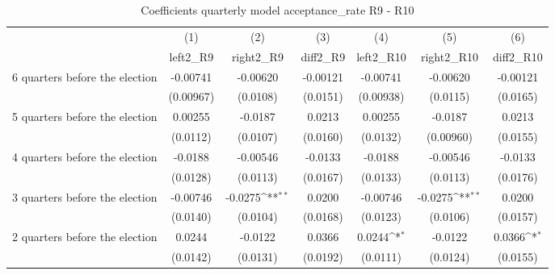 \begin{table}[!ht]\centering \footnotesize
\def\sym#1{\ifmmode^{#1}\else\(^{#1}\)\fi}
\caption{Coefficients quarterly model acceptance\_rate R9 - R10}
\begin{tabular}{l*{6}{c}}
\hline\hline
                    &\multicolumn{1}{c}{(1)}&\multicolumn{1}{c}{(2)}&\multicolumn{1}{c}{(3)}&\multicolumn{1}{c}{(4)}&\multicolumn{1}{c}{(5)}&\multicolumn{1}{c}{(6)}\\
                    &\multicolumn{1}{c}{left2\_R9}&\multicolumn{1}{c}{right2\_R9}&\multicolumn{1}{c}{diff2\_R9}&\multicolumn{1}{c}{left2\_R10}&\multicolumn{1}{c}{right2\_R10}&\multicolumn{1}{c}{diff2\_R10}\\
\hline
 6 quarters before the election&    -0.00741         &    -0.00620         &    -0.00121         &    -0.00741         &    -0.00620         &    -0.00121         \\
                    &   (0.00967)         &    (0.0108)         &    (0.0151)         &   (0.00938)         &    (0.0115)         &    (0.0165)         \\
[1em]
 5 quarters before the election&     0.00255         &     -0.0187         &      0.0213         &     0.00255         &     -0.0187         &      0.0213         \\
                    &    (0.0112)         &    (0.0107)         &    (0.0160)         &    (0.0132)         &   (0.00960)         &    (0.0155)         \\
[1em]
 4 quarters before the election&     -0.0188         &    -0.00546         &     -0.0133         &     -0.0188         &    -0.00546         &     -0.0133         \\
                    &    (0.0128)         &    (0.0113)         &    (0.0167)         &    (0.0133)         &    (0.0113)         &    (0.0176)         \\
[1em]
 3 quarters before the election&    -0.00746         &     -0.0275\sym{**} &      0.0200         &    -0.00746         &     -0.0275\sym{**} &      0.0200         \\
                    &    (0.0140)         &    (0.0104)         &    (0.0168)         &    (0.0123)         &    (0.0106)         &    (0.0157)         \\
[1em]
 2 quarters before the election&      0.0244         &     -0.0122         &      0.0366         &      0.0244\sym{*}  &     -0.0122         &      0.0366\sym{*}  \\
                    &    (0.0142)         &    (0.0131)         &    (0.0192)         &    (0.0111)         &    (0.0124)         &    (0.0155)         \\

\end{tabular}
\end{table}
